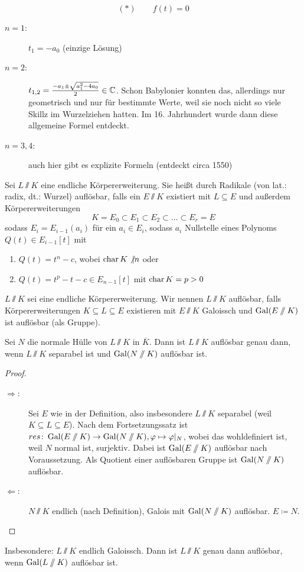 \documentclass[12pt,a4paper]{scrartcl}
\begin{document}
$$ (*)\qquad f(t) = 0$$
\begin{description}
	\item[$n = 1$:] $t_1 = -a_0$ (einzige Lösung)
	\item[$n = 2$:] $t_{1,2} = \frac{-a_1\pm\sqrt{a_1^2-4a_0}}{2}\in\mathbb C$. Schon Babylonier konnten das, allerdings nur geometrisch und nur für bestimmte Werte, weil sie noch nicht so viele Skillz im Wurzelziehen hatten. Im 16. Jahrhundert wurde dann diese allgemeine Formel entdeckt.
	\item[$n = 3,4$:] auch hier gibt es explizite Formeln (entdeckt circa 1550)
\end{description}
\begin{defi}
	Sei $L\sslash K$ eine endliche Körpererweiterung. Sie heißt durch Radikale (von lat.: radix, dt.: Wurzel) auflösbar, falls ein $E\sslash K$ existiert mit $L\subseteq E$ und außerdem Körpererweiterungen
	$$K = E_0\subset E_1\subset E_2\subset \dots \subset E_r = E$$
	sodass $E_i = E_{i-1}(a_i)$ für ein $a_i\in E_i$, sodass $a_i$ Nullstelle eines Polynoms $Q(t)\in E_{i-1}[t]$ mit
	\begin{enumerate}
		\item $Q(t) = t^n-c$, wobei $\operatorname{char} K \not|n$ oder
		\item $Q(t) = t^p-t-c\in E_{n-1}[t]$ mit $\operatorname{char} K = p>0$
	\end{enumerate}
\end{defi}
\begin{defi}
	$L\sslash K$ sei eine endliche Körpererweiterung. Wir nennen $L\sslash K$ auflösbar, falls Körpererweiterungen $K\subseteq L\subseteq E$ existieren mit $E\sslash K$ Galoissch und $\operatorname{Gal}(E\sslash K)$ ist auflösbar (als Gruppe).
\end{defi}
\begin{lem}
	Sei $N$ die normale Hülle von $L\sslash K$ in $\overline{K}$. Dann ist $L\sslash K$ auflösbar genau dann, wenn $L\sslash K$ separabel ist und $\operatorname{Gal}(N\sslash K)$ auflösbar ist.
\end{lem}

\begin{proof}
	\begin{description}
		\item[\glqq$\Rightarrow$\grqq:] Sei $E$ wie in der Definition, also insbesondere $L\sslash K$ separabel (weil $K\subseteq L\subseteq E$). Nach dem Fortsetzungssatz ist $res\colon\operatorname{Gal}(E\sslash K)\to \operatorname{Gal}(N\sslash K), \varphi\mapsto \varphi|_N$, wobei das wohldefiniert ist, weil $N$ normal ist, surjektiv.
		Dabei ist $\operatorname{Gal}(E\sslash K)$ auflösbar nach Voraussetzung. Als Quotient einer auflösbaren Gruppe ist $\operatorname{Gal}(N\sslash K)$ auflösbar.
		\item[\glqq$\Leftarrow$\grqq:] $N\sslash K$ endlich (nach Definition), Galois mit $\operatorname{Gal}(N\sslash K)$ auflösbar. $E\coloneqq N$.
	\end{description}
\end{proof}
Insbesondere: $L\sslash K$ endlich Galoissch. Dann ist $L\sslash K$ genau dann auflösbar, wenn $\operatorname{Gal}(L\sslash K)$ auflösbar ist.
\end{document}

